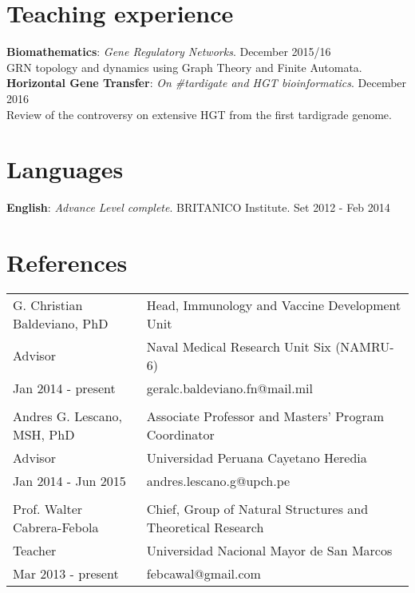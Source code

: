 \documentclass[margin,line]{res}
\begin{document}
\begin{resume}
\section{\sc Teaching experience}
{\bf Biomathematics}: {\em Gene Regulatory Networks}. \hfill {December 2015/16}\\ GRN topology and dynamics using Graph Theory and Finite Automata. \\ %
{\bf Horizontal Gene Transfer}: {\em On \#tardigate and HGT bioinformatics}. \hfill {December 2016}\\ Review of the controversy on extensive HGT from the first tardigrade genome. \\

\section{\sc Languages}
{\bf English}: {\em Advance Level complete}. BRITANICO Institute. \hfill {Set 2012 - Feb 2014} \\

\section{\sc References }

\begin{tabular}{ l l }
	G. Christian Baldeviano, PhD & Head, Immunology and Vaccine Development Unit \\
	Advisor & Naval Medical Research Unit Six (NAMRU-6)\\
	Jan 2014 - present & geralc.baldeviano.fn@mail.mil\\
	&\\
	Andres G. Lescano, MSH, PhD & Associate Professor and Masters' Program Coordinator\\
	Advisor & Universidad Peruana Cayetano Heredia\\
	Jan 2014 - Jun 2015 & andres.lescano.g@upch.pe\\
	&\\
	Prof. Walter Cabrera-Febola & Chief, Group of Natural Structures and Theoretical Research \\
	Teacher & Universidad Nacional Mayor de San Marcos\\
	Mar 2013 - present & febcawal@gmail.com\\	
\end{tabular}


\end{resume}
\end{document}
